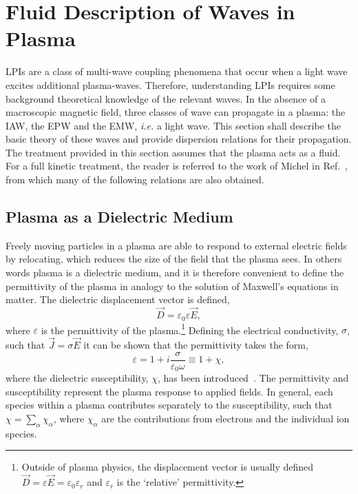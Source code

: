 \section{Fluid Description of Waves in Plasma}%
\label{sec:theory_waves_plasmas}

\ac{LPIs} are a class of multi-wave coupling phenomena that occur when a light wave excites additional plasma-waves.
Therefore, understanding \ac{LPIs} requires some background theoretical knowledge of the relevant waves.
In the absence of a macroscopic magnetic field, three classes of wave can propagate in a plasma: the \ac{IAW}, the \ac{EPW} and the \ac{EMW}, \textit{i.e.} a light wave.
This section shall describe the basic theory of these waves and provide dispersion relations for their propagation.
The treatment provided in this section assumes that the plasma acts as a fluid.
For a full kinetic treatment, the reader is referred to the work of Michel in Ref.~\cite{michel_introduction_2023}, from which many of the following relations are also obtained.

\subsection{Plasma as a Dielectric Medium}%
\label{sec:theory_dielectric}

Freely moving particles in a plasma are able to respond to external electric fields by relocating, which reduces the size of the field that the plasma sees.
In others words plasma is a dielectric medium, and it is therefore convenient to define the permittivity of the plasma in analogy to the solution of Maxwell's equations in matter.
The dielectric displacement vector is defined,
\begin{equation}
    \vec{D} = \varepsilon_0 \varepsilon \vec{E},
\end{equation}
where $\varepsilon$ is the permittivity of the plasma.\footnote{Outside of plasma physics, the displacement vector is usually defined $\vec{D} = \varepsilon\vec{E} = \varepsilon_0 \varepsilon_{r}$ and $\varepsilon_r$ is the `relative' permittivity.}
Defining the electrical conductivity, $\sigma$, such that $\vec{J}=\sigma\vec{E}$ it can be shown that the permittivity takes the form,
\begin{equation}
    \label{eq:theory_perm_def}
    \varepsilon = 1 + i\frac{\sigma}{\varepsilon_0\omega} \equiv 1 + \chi,
\end{equation}
where the dielectric susceptibility, $\chi$, has been introduced~\cite{michel_introduction_2023}.
The permittivity and susceptibility represent the plasma response to applied fields.
In general, each species within a plasma contributes separately to the susceptibility, such that $\chi = \sum\nolimits_\alpha \chi_\alpha$, where $\chi_\alpha$ are the contributions from electrons and the individual ion species.

